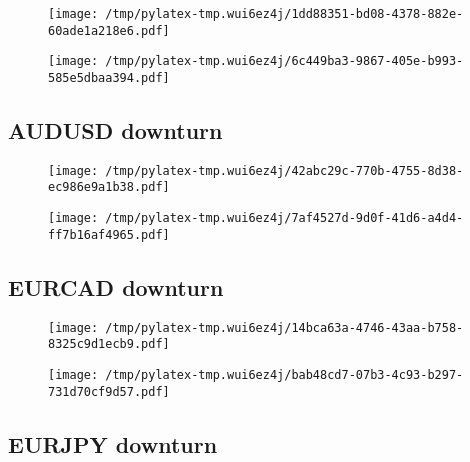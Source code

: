 \documentclass{article}%
\begin{document}
\begin{figure}[htbp]%
\centering%
\texttt{[image: /tmp/pylatex-tmp.wui6ez4j/1dd88351-bd08-4378-882e-60ade1a218e6.pdf]}%
\end{figure}

%


\begin{figure}[htbp]%
\centering%
\texttt{[image: /tmp/pylatex-tmp.wui6ez4j/6c449ba3-9867-405e-b993-585e5dbaa394.pdf]}%
\end{figure}

%
\newpage %
\subsection{AUDUSD downturn}%
\label{subsec:AUDUSDdownturn}%


\begin{figure}[htbp]%
\centering%
\texttt{[image: /tmp/pylatex-tmp.wui6ez4j/42abc29c-770b-4755-8d38-ec986e9a1b38.pdf]}%
\end{figure}

%


\begin{figure}[htbp]%
\centering%
\texttt{[image: /tmp/pylatex-tmp.wui6ez4j/7af4527d-9d0f-41d6-a4d4-ff7b16af4965.pdf]}%
\end{figure}

%
\newpage %
\subsection{EURCAD downturn}%
\label{subsec:EURCADdownturn}%


\begin{figure}[htbp]%
\centering%
\texttt{[image: /tmp/pylatex-tmp.wui6ez4j/14bca63a-4746-43aa-b758-8325c9d1ecb9.pdf]}%
\end{figure}

%


\begin{figure}[htbp]%
\centering%
\texttt{[image: /tmp/pylatex-tmp.wui6ez4j/bab48cd7-07b3-4c93-b297-731d70cf9d57.pdf]}%
\end{figure}

%
\newpage %
\subsection{EURJPY downturn}%
\label{subsec:EURJPYdownturn}%
\end{document}
